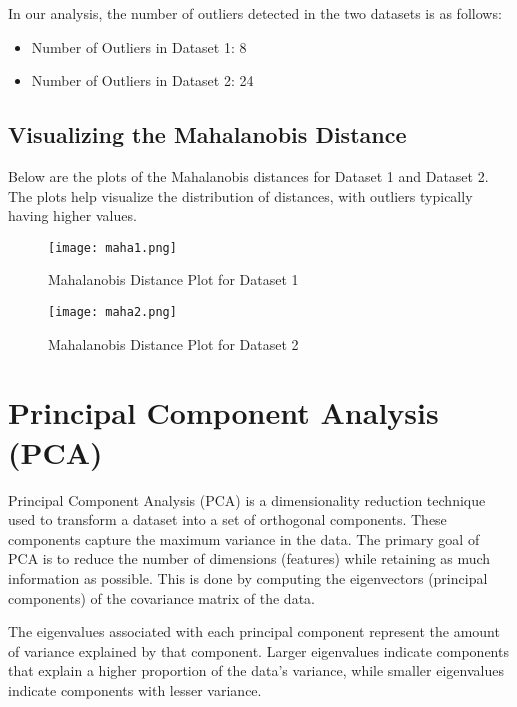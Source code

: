 \documentclass[11pt]{article}
\begin{document}
In our analysis, the number of outliers detected in the two datasets is as follows:
\begin{itemize}
    \item Number of Outliers in Dataset 1: 8
    \item Number of Outliers in Dataset 2: 24
\end{itemize}

\subsection{Visualizing the Mahalanobis Distance}

Below are the plots of the Mahalanobis distances for Dataset 1 and Dataset 2. The plots help visualize the distribution of distances, with outliers typically having higher values.

\begin{figure}[H]
\centering
\begin{minipage}{0.45\textwidth}
    \centering
    \texttt{[image: maha1.png]}
    \caption{Mahalanobis Distance Plot for Dataset 1}
    \label{fig:maha1}
\end{minipage}
\hspace{0.5cm}
\begin{minipage}{0.45\textwidth}
    \centering
    \texttt{[image: maha2.png]}
    \caption{Mahalanobis Distance Plot for Dataset 2}
    \label{fig:maha2}
\end{minipage}
\end{figure}

\section{Principal Component Analysis (PCA)}
Principal Component Analysis (PCA) is a dimensionality reduction technique used to transform a dataset into a set of orthogonal components. These components capture the maximum variance in the data. The primary goal of PCA is to reduce the number of dimensions (features) while retaining as much information as possible. This is done by computing the eigenvectors (principal components) of the covariance matrix of the data.

The eigenvalues associated with each principal component represent the amount of variance explained by that component. Larger eigenvalues indicate components that explain a higher proportion of the data's variance, while smaller eigenvalues indicate components with lesser variance.
\end{document}
